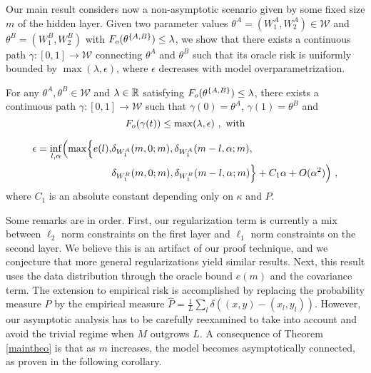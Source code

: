 Our main result considers now a non-asymptotic scenario given by some fixed
size $m$ of the hidden layer. Given two parameter values $\theta^A = (W_1^A, W_2^A) \in \mathcal{W}$ 
and $\theta^B= (W_1^B, W_2^B)$ with $F_{o}(\theta^{\{A,B\} } ) \leq \lambda$, 
we show that there exists a continuous path 
$\gamma: [0,1] \to \mathcal{W}$ connecting $\theta^A$ and $\theta^B$ 
such that its oracle risk is uniformly bounded by $\max(\lambda, \epsilon)$, where $\epsilon$ 
decreases with model overparametrization. 
\begin{theorem}
\label{maintheo}
For any $\theta^A, \theta^B \in \mathcal{W}$ and $\lambda \in {\mathbb{R}}$ satisfying $F_{o}(\theta^{\{A,B\}}) \leq \lambda$, there exists a continuous path $\gamma: [0,1] \to \mathcal{W}$ such that
$\gamma(0) = \theta^A$, $\gamma(1) = \theta^B$ and
\begin{equation}
F_{o}( \gamma(t) )  \leq \max( \lambda, \epsilon)~,\text{ with}
\end{equation}

\begin{align}
\epsilon = \inf_{l, \alpha} \Bigl(\max \Bigl\{ e(l), &\delta_{W_1^A}(m, 0; m ) , \delta_{W_1^A}(m-l, \alpha; m ) ,   \\ 
&\delta_{W_1^B}(m, 0; m ) ,\delta_{W_1^B} (m-l, \alpha; m ) \Bigr\} + C_1 \alpha  + O(\alpha^2) \Bigr)~,
\end{align}
where $C_1$ is an absolute constant depending only on $\kappa$ and $P$.
\end{theorem}
Some remarks are in order. First, our regularization term is currently a mix between $\ell_2$ norm constraints on the first layer and $\ell_1$ norm constraints on the second layer. We believe this is an artifact of our proof technique, and we conjecture that more general regularizations yield similar results. Next, this result uses the data distribution through the oracle bound $e(m)$ and the covariance term. The 
extension to empirical risk is accomplished by replacing the probability measure $P$ by the empirical measure $\hat{P} = \frac{1}{L} \sum_l \delta\left( (x,y) - (x_l, y_l)\right) $. However, our asymptotic analysis has to be carefully reexamined to take into account and avoid the trivial regime when $M$ outgrows $L$.  
A consequence of Theorem \ref{maintheo} is that as $m$ increases, the model becomes asymptotically connected, as proven in the following corollary.
